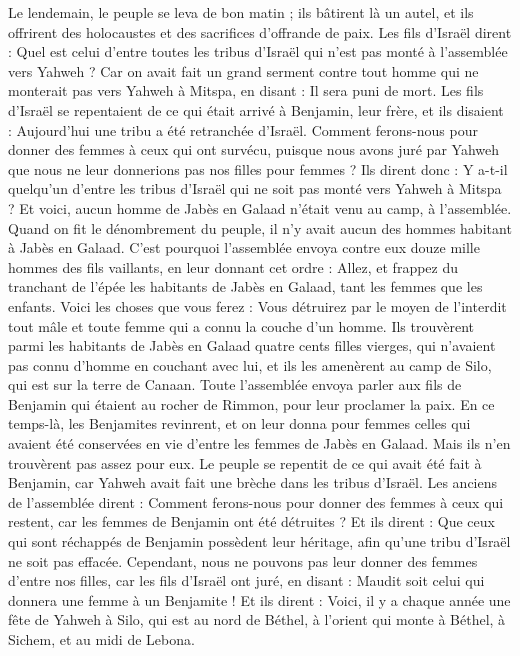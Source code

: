 \begin{multicols}{2}
Le lendemain, le peuple se leva de bon matin ; ils bâtirent là un autel, et ils offrirent des holocaustes et des sacrifices d'offrande de paix.
Les fils d'Israël dirent : Quel est celui d'entre toutes les tribus d'Israël qui n'est pas monté à l'assemblée vers Yahweh ? Car on avait fait un grand serment contre tout homme qui ne monterait pas vers Yahweh à Mitspa, en disant : Il sera puni de mort.
Les fils d'Israël se repentaient de ce qui était arrivé à Benjamin, leur frère, et ils disaient : Aujourd'hui une tribu a été retranchée d'Israël.
Comment ferons-nous pour donner des femmes à ceux qui ont survécu, puisque nous avons juré par Yahweh que nous ne leur donnerions pas nos filles pour femmes ?
Ils dirent donc : Y a-t-il quelqu'un d'entre les tribus d'Israël qui ne soit pas monté vers Yahweh à Mitspa ? Et voici, aucun homme de Jabès en Galaad n'était venu au camp, à l'assemblée.
Quand on fit le dénombrement du peuple, il n'y avait aucun des hommes habitant à Jabès en Galaad.
C'est pourquoi l'assemblée envoya contre eux douze mille hommes des fils vaillants, en leur donnant cet ordre : Allez, et frappez du tranchant de l'épée les habitants de Jabès en Galaad, tant les femmes que les enfants.
Voici les choses que vous ferez : Vous détruirez par le moyen de l'interdit tout mâle et toute femme qui a connu la couche d'un homme.
Ils trouvèrent parmi les habitants de Jabès en Galaad quatre cents filles vierges, qui n'avaient pas connu d'homme en couchant avec lui, et ils les amenèrent au camp de Silo, qui est sur la terre de Canaan.
Toute l'assemblée envoya parler aux fils de Benjamin qui étaient au rocher de Rimmon,  pour leur proclamer la paix.
En ce temps-là, les Benjamites revinrent, et on leur donna pour femmes celles qui avaient été conservées en vie d'entre les femmes de Jabès en Galaad. Mais ils n’en trouvèrent pas assez pour eux.
Le peuple se repentit de ce qui avait été fait à Benjamin, car Yahweh avait fait une brèche dans les tribus d'Israël.
Les anciens de l'assemblée dirent : Comment ferons-nous pour donner des femmes à ceux qui restent, car les femmes de Benjamin ont été détruites ?
Et ils dirent : Que ceux qui sont réchappés de Benjamin possèdent leur héritage, afin qu'une tribu d'Israël ne soit pas effacée.
Cependant, nous ne pouvons pas leur donner des femmes d'entre nos filles, car les fils d'Israël ont juré, en disant : Maudit soit celui qui donnera une femme à un Benjamite !
Et ils dirent : Voici, il y a chaque année une fête de Yahweh à Silo, qui est au nord de Béthel, à l'orient qui monte à Béthel, à Sichem, et au midi de Lebona.

\end{multicols}
